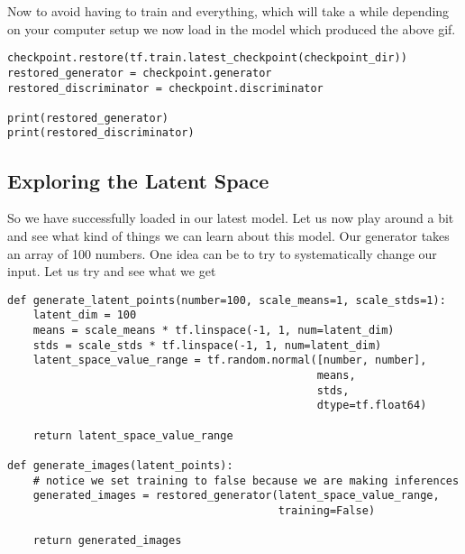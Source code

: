 \documentclass[%
oneside,                 %
final,                   %
10pt]{article}
\begin{document}
Now to avoid having to train and everything, which will take a while depending
on your computer setup we now load in the model which produced the above gif.








\begin{verbatim}
checkpoint.restore(tf.train.latest_checkpoint(checkpoint_dir))
restored_generator = checkpoint.generator
restored_discriminator = checkpoint.discriminator

print(restored_generator)
print(restored_discriminator)

\end{verbatim}


\subsection*{Exploring the Latent Space}

So we have successfully loaded in our latest model. Let us now play around a bit
and see what kind of things we can learn about this model. Our generator takes
an array of 100 numbers. One idea can be to try to systematically change our
input. Let us try and see what we get



















\begin{verbatim}
def generate_latent_points(number=100, scale_means=1, scale_stds=1):
    latent_dim = 100
    means = scale_means * tf.linspace(-1, 1, num=latent_dim)
    stds = scale_stds * tf.linspace(-1, 1, num=latent_dim)
    latent_space_value_range = tf.random.normal([number, number],
                                                means,
                                                stds,
                                                dtype=tf.float64)

    return latent_space_value_range

def generate_images(latent_points):
    # notice we set training to false because we are making inferences
    generated_images = restored_generator(latent_space_value_range,
                                          training=False)

    return generated_images

\end{verbatim}
\end{document}
